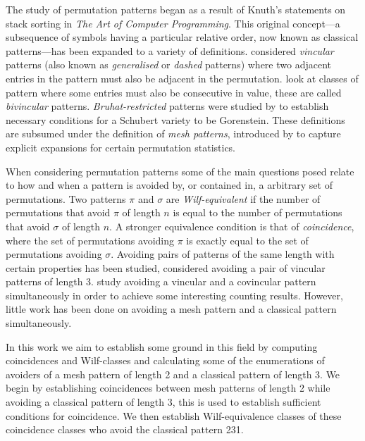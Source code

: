The study of permutation patterns began as a result of Knuth's statements on
stack sorting in \emph{The Art of Computer Programming}\cite[p.~243,
Ex.~5,6]{Knuth:1997:ACP:260999}. This original concept---a subsequence of
symbols having a particular relative order, now known as classical
patterns---has been expanded to a variety of definitions.
\textcite{babstein2000} considered \emph{vincular} patterns (also known as
\emph{generalised} or \emph{dashed} patterns) where two adjacent entries in the
pattern must also be adjacent in the permutation. \textcite{MR2652101} look at
classes of pattern where some entries must also be consecutive in value, these are called
\emph{bivincular} patterns. \emph{Bruhat-restricted} patterns were studied by
\textcite{MR2264071} to establish necessary conditions for a Schubert variety to
be Gorenstein. These definitions are subsumed under the definition of \emph{mesh
patterns}, introduced by \textcite{journals/combinatorics/BrandenC11} to capture
explicit expansions for certain permutation statistics.

When considering permutation patterns some of the main questions posed relate to
how and when a pattern is avoided by, or contained in, a arbitrary set of
permutations. Two patterns \(\pi\) and \(\sigma\) are \emph{Wilf-equivalent} if
the number of permutations that avoid \(\pi\) of length \(n\) is equal to the
number of permutations that avoid \(\sigma\) of length \(n\). A stronger
equivalence condition is that of \emph{coincidence}, where the set of
permutations avoiding \(\pi\) is exactly equal to the set of permutations
avoiding \(\sigma\). Avoiding pairs of patterns of the same length with certain
properties has been studied, \textcite{MR2178749} considered avoiding
a pair of vincular patterns of length 3. \textcite{2015arXiv151203226B} study
avoiding a vincular and a covincular pattern simultaneously in order to achieve
some interesting counting results. However, little work has been done on
avoiding a mesh pattern and a classical pattern simultaneously.

In this work we aim to establish some ground in this field by computing
coincidences and Wilf-classes and calculating some of the enumerations of
avoiders of a mesh pattern of length 2 and a classical pattern of length 3. We
begin by establishing coincidences between mesh patterns of length 2 while
avoiding a classical pattern of length 3, this is used to establish sufficient
conditions for coincidence. We then establish Wilf-equivalence classes of these
coincidence classes who avoid the classical pattern 231.
